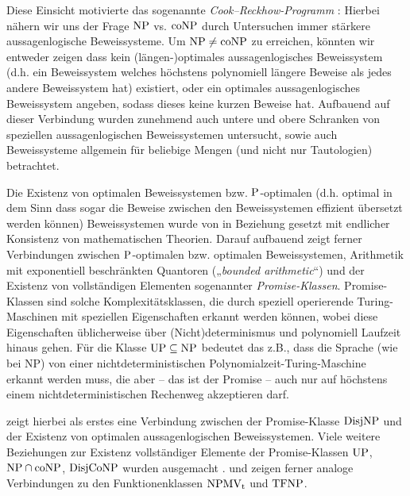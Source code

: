 Diese Einsicht motivierte das sogenannte \emph{Cook–Reckhow-Programm} \parencite[vgl.][]{buss_lectures_1996}: Hierbei nähern wir uns der Frage $\NP$ vs. $\coNP$ durch Untersuchen immer stärkere aussagenlogische Beweissysteme.
Um $\NP\neq\coNP$ zu erreichen, könnten wir entweder zeigen dass kein (längen-)optimales aussagenlogisches Beweissystem (d.h. ein Beweissystem welches höchstens polynomiell längere Beweise als jedes andere Beweissystem hat) existiert, oder ein optimales aussagenlogisches Beweissystem angeben, sodass dieses keine kurzen Beweise hat.
Aufbauend auf dieser Verbindung wurden zunehmend auch untere und obere Schranken von speziellen aussagenlogischen Beweissystemen untersucht, sowie auch Beweissysteme allgemein für beliebige Mengen (und nicht nur Tautologien) betrachtet.

Die Existenz von optimalen Beweissystemen bzw. $\P$-optimalen (d.h. optimal in dem Sinn dass sogar die Beweise zwischen den Beweissystemen effizient übersetzt werden können) Beweissystemen  wurde von \textcite{krajicek_propositional_1989} in Beziehung gesetzt mit endlicher Konsistenz von mathematischen Theorien. Darauf aufbauend zeigt \textcites[Kap.~6]{pudlak_logical_2013}{pudlak_incompleteness_2017} ferner Verbindungen zwischen $\P$-optimalen bzw. optimalen Beweissystemen, Arithmetik mit exponentiell beschränkten Quantoren („\emph{bounded arithmetic}“) und der Existenz von vollständigen Elementen sogenannter \emph{Promise-Klassen}. Promise-Klassen sind solche Komplexitätsklassen, die durch speziell operierende Turing-Maschinen mit speziellen Eigenschaften erkannt werden können, wobei diese Eigenschaften üblicherweise über (Nicht)determinismus und polynomiell Laufzeit hinaus gehen. Für die Klasse $\UP\subseteq\NP$ bedeutet das z.B., dass die Sprache (wie bei NP) von einer nichtdeterministischen Polynomialzeit-Turing-Maschine erkannt werden muss, die aber – das ist der Promise – auch nur auf höchstens einem nichtdeterministischen Rechenweg akzeptieren darf.

\textcite{razborov_provably_1994} zeigt hierbei als erstes eine Verbindung zwischen der Promise-Klasse $\DisjNP$ und der Existenz von optimalen aussagenlogischen Beweissystemen. Viele weitere Beziehungen zur Existenz vollständiger Elemente der Promise-Klassen $\UP$, $ \NP\cap\coNP$, $ \DisjCoNP$ wurden ausgemacht \parencites(vgl. auch)(){messner_simulation_2001}{kobler_optimal_2003}{beyersdorff_there_2011}.
\textcite{beyersdorff_nondeterministic_2009} und \textcite{pudlak_incompleteness_2017} zeigen ferner analoge Verbindungen zu den Funktionenklassen $\NPMVt$ und $\TFNP$.

